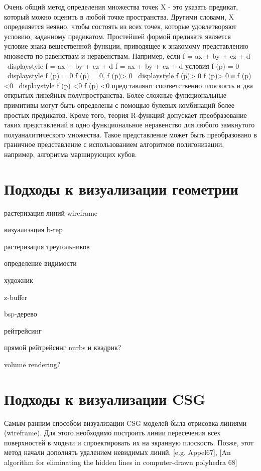 Очень общий метод определения множества точек X - это указать предикат, который можно оценить в любой точке пространства. Другими словами, X определяется неявно, чтобы состоять из всех точек, которые удовлетворяют условию, заданному предикатом. Простейшей формой предиката является условие знака вещественной функции, приводящее к знакомому представлению множеств по равенствам и неравенствам. Например, если f = ax + by + cz + d {\ displaystyle f = ax + by + cz + d} f = ax + by + cz + d условия f (p) = 0 {\ displaystyle f (p) = 0} f (p) = 0, f (p)> 0 {\ displaystyle f (p)> 0} f (p)> 0 и f (p) <0 {\ displaystyle f (p) <0} f (p) <0 представляют соответственно плоскость и два открытых линейных полупространства. Более сложные функциональные примитивы могут быть определены с помощью булевых комбинаций более простых предикатов. Кроме того, теория R-функций допускает преобразование таких представлений в одно функциональное неравенство для любого замкнутого полуаналитического множества. Такое представление может быть преобразовано в граничное представление с использованием алгоритмов полигонизации, например, алгоритма марширующих кубов.

\section{Подходы к визуализации геометрии} \label{sect_geom_vis}


растеризация линий
wireframe

визуализация b-rep

растеризация треугольников

определение видимости

художник

z-buffer

bsp-дерево

рейтрейсинг

прямой рейтрейсинг nurbs и квадрик?

volume rendering?

\section{Подходы к визуализации CSG} \label{sect_csg_vis}


Самым ранним способом визуализации CSG моделей была отрисовка линиями (wireframe). Для этого необходимо построить линии пересечения всех поверхностей в модели и спроектировать их на экранную плоскость. Позже, этот метод начали дополнять удалением невидимых линий. [e.g. Appel67], [An algorithm for eliminating the hidden lines in computer-drawn polyhedra 68]

